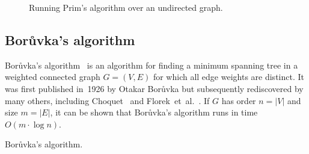 \begin{figure}[!htbp]
\centering
{}

\caption{Running Prim's algorithm over an undirected graph.}
\label{fig:tree_forests:Prim_algorithm_undirected_graph}
\end{figure}



\subsection{Bor\r{u}vka's algorithm}
\label{subsec:trees_forests:Boruvka_algorithm}

Bor\r{u}vka's
algorithm~\cite{Boruvka1926a,Boruvka1926b}
is an algorithm for finding a minimum
spanning tree in a weighted connected graph $G = (V,E)$ for which all
edge weights are distinct. It was first published in~1926 by Otakar
Bor\r{u}vka but subsequently rediscovered
by many others, including
Choquet~\cite{Choquet1938} and
Florek~et~al.~\cite{FlorekEtAl1951}.
If $G$ has order $n = |V|$ and size $m = |E|$, it can be shown that
Bor\r{u}vka's algorithm runs in time
$O(m \cdot \log n)$.

\begin{algorithm}[!htbp]

\caption{Bor\r{u}vka's algorithm.}
\label{alg:trees_forests:Boruvka}
\end{algorithm}

